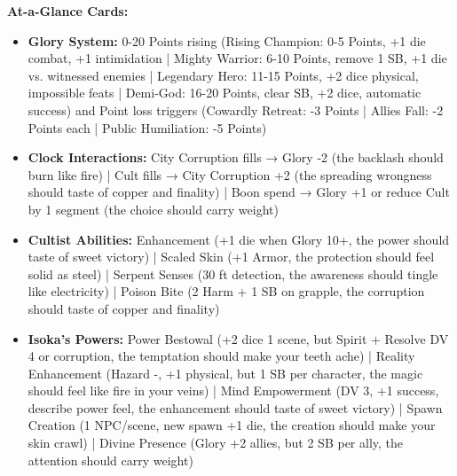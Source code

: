 \documentclass[11pt]{article}
\begin{document}
\textbf{At-a-Glance Cards:}
\begin{itemize}
\item \textbf{Glory System:} 0-20 Points rising (Rising Champion: 0-5 Points, +1 die combat, +1 intimidation | Mighty Warrior: 6-10 Points, remove 1 SB, +1 die vs. witnessed enemies | Legendary Hero: 11-15 Points, +2 dice physical, impossible feats | Demi-God: 16-20 Points, clear SB, +2 dice, automatic success) and Point loss triggers (Cowardly Retreat: -3 Points | Allies Fall: -2 Points each | Public Humiliation: -5 Points)
\item \textbf{Clock Interactions:} City Corruption fills → Glory -2 (the backlash should burn like fire) | Cult fills → City Corruption +2 (the spreading wrongness should taste of copper and finality) | Boon spend → Glory +1 or reduce Cult by 1 segment (the choice should carry weight)
\item \textbf{Cultist Abilities:} Enhancement (+1 die when Glory 10+, the power should taste of sweet victory) | Scaled Skin (+1 Armor, the protection should feel solid as steel) | Serpent Senses (30 ft detection, the awareness should tingle like electricity) | Poison Bite (2 Harm + 1 SB on grapple, the corruption should taste of copper and finality)
\item \textbf{Isoka's Powers:} Power Bestowal (+2 dice 1 scene, but Spirit + Resolve DV 4 or corruption, the temptation should make your teeth ache) | Reality Enhancement (Hazard -, +1 physical, but 1 SB per character, the magic should feel like fire in your veins) | Mind Empowerment (DV 3, +1 success, describe power feel, the enhancement should taste of sweet victory) | Spawn Creation (1 NPC/scene, new spawn +1 die, the creation should make your skin crawl) | Divine Presence (Glory +2 allies, but 2 SB per ally, the attention should carry weight)
\end{itemize}
\end{document}
